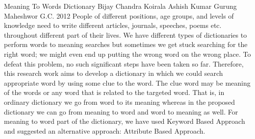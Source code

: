  \begin{conf-abstract}[]
{Meaning To Words Dictionary}
{
Bijay Chandra Koirala
Ashish Kumar Gurung
Maheshwor G.C.
}
{2012}
People of different positions, age groups, and levels of knowledge need to write different articles, journals, speeches, poems etc. throughout different part of their lives. We have different types of dictionaries to perform words to meaning searches but sometimes we get stuck searching for the right word; we might even end up putting the wrong word on the wrong place. To defeat this problem, no such significant steps have been taken so far. Therefore, this research work aims to develop a dictionary in which we could search appropriate word by using some clue to the word. The clue word may be meaning of the words or any word that is related to the targeted word. That is, in ordinary dictionary we go from word to its meaning whereas in the proposed dictionary we can go from meaning to word and word to meaning as well. For meaning to word part of the dictionary, we have used Keyword Based Approach and suggested an alternative approach: Attribute Based Approach.
  \end{conf-abstract}